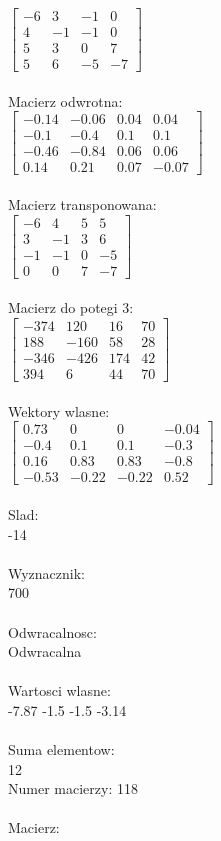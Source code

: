 \documentclass[a4paper,12pt]{article}
\begin{document}
$\begin{bmatrix} -6&3&-1&0\\4&-1&-1&0\\5&3&0&7\\5&6&-5&-7 \end{bmatrix}$
\\
\\
Macierz odwrotna:\\

$\begin{bmatrix} -0.14&-0.06&0.04&0.04\\-0.1&-0.4&0.1&0.1\\-0.46&-0.84&0.06&0.06\\0.14&0.21&0.07&-0.07 \end{bmatrix}$
\\
\\
Macierz transponowana:\\

$\begin{bmatrix} -6&4&5&5\\3&-1&3&6\\-1&-1&0&-5\\0&0&7&-7 \end{bmatrix}$
\\
\\
Macierz do potegi 3:\\

$\begin{bmatrix} -374&120&16&70\\188&-160&58&28\\-346&-426&174&42\\394&6&44&70 \end{bmatrix}$
\\
\\
Wektory wlasne:\\

$\begin{bmatrix} 0.73&0&0&-0.04\\-0.4&0.1&0.1&-0.3\\0.16&0.83&0.83&-0.8\\-0.53&-0.22&-0.22&0.52 \end{bmatrix}$
\\
\\
Slad:\\
-14
\\
\\
Wyznacznik:\\
700
\\
\\
Odwracalnosc:\\
Odwracalna
\\
\\
Wartosci wlasne:\\
-7.87 -1.5 -1.5 -3.14
\\
\\
Suma elementow:\\
12
\\
\newpage
Numer macierzy:
118
\\
\\
Macierz:\\
\end{document}
